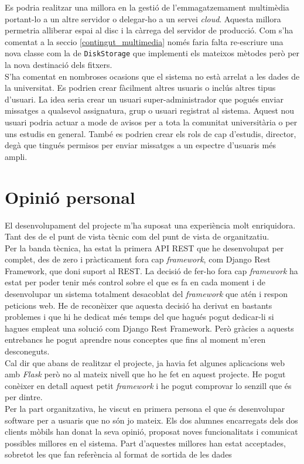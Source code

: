Es podria realitzar una millora en la gestió de  l'emmagatzemament multimèdia portant-lo a un altre servidor o delegar-ho a un servei   \emph{cloud}. Aquesta millora permetria alliberar espai al disc i la càrrega del servidor de producció. Com s'ha comentat a la seccio \ref{contingut_multimedia} només faria falta re-escriure una nova classe com la de \texttt{DiskStorage} que implementi els mateixos mètodes però per la nova destinació dels fitxers.\\

S'ha comentat en nombroses ocasions que el sistema no està arrelat a les dades de la universitat. Es podrien crear fàcilment altres usuaris o inclús altres tipus d'usuari. La idea seria crear un usuari super-administrador que pogués enviar missatges a qualsevol assignatura, grup o usuari registrat al sistema. Aquest nou usuari podria actuar a mode de avisos per a tota la comunitat universitària o per uns estudis en general. També es podrien crear els rols de cap d'estudis, director, degà que tingués permisos per enviar missatges a un espectre d'usuaris més ampli.


\section{Opinió personal}

El desenvolupament del projecte m'ha suposat una experiència molt enriquidora. Tant des de el punt de vista tècnic com del punt de vista de organitzatiu.\\

Per la banda tècnica, ha estat la primera \ac{API} \ac{REST} que he desenvolupat per complet, des de zero i pràcticament fora cap \emph{framework}, com Django Rest Framework\cite{djangorestframework},  que doni suport al \ac{REST}. La decisió de fer-ho fora cap \emph{framework} ha estat per poder tenir més control sobre el que es fa en cada moment i de desenvolupar un sistema totalment desacoblat del \emph{framework} que atén i respon peticions web. He de reconèixer que aquesta decisió ha derivat en bastants problemes i que hi he dedicat més temps del que hagués pogut dedicar-li si hagues empleat una solució com Django Rest Framework. Però gràcies a aquests entrebancs he pogut aprendre nous conceptes que fins al moment m'eren desconeguts.\\

Cal dir que abans de realitzar el projecte, ja havia fet algunes aplicacions web amb \emph{Flask} però no al mateix nivell que ho he fet en aquest projecte. He pogut conèixer en detall aquest petit \emph{framework} i he pogut comprovar lo senzill que és per dintre. \\


Per la part organitzativa, he viscut en primera persona el que és desenvolupar software per a usuaris que no són jo mateix. Els dos alumnes encarregats dels dos clients mòbils han donat la seva opinió, proposat noves funcionalitats i comunicat possibles millores en el sistema. Part d'aquestes millores han estat acceptades, sobretot les que fan referència al format de sortida de les dades

